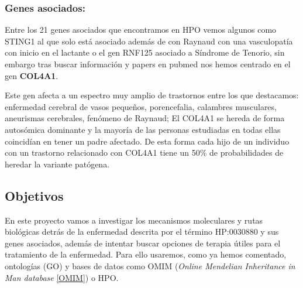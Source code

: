 \subsubsection{Genes asociados:}

Entre los 21 genes asociados que encontramos en HPO vemos algunos como STING1 al que solo está asociado además de con Raynaud con una vasculopatía con inicio en el lactante o el gen RNF125 asociado a Síndrome de Tenorio, sin embargo tras buscar información y papers en pubmed nos hemos centrado en el gen \textbf{COL4A1}. \cite{Plaisier1993}

Este gen afecta a un espectro muy amplio de trastornos entre los que destacamos: enfermedad cerebral de vasos pequeños, porencefalia, calambres musculares, aneurismas cerebrales, fenómeno de Raynaud; El COL4A1 se hereda de forma autosómica dominante y la mayoría de las personas estudiadas en todas ellas coincidían en tener un padre afectado. De esta forma cada hijo de un individuo con un trastorno relacionado con COL4A1 tiene un 50\% de probabilidades de heredar la variante patógena.

\subsection{Objetivos}

En este proyecto vamos a investigar los mecanismos moleculares y rutas biológicas detrás de la enfermedad descrita por el término HP:0030880 y sus genes asociados, además de intentar buscar opciones de terapia útiles para el tratamiento de la enfermedad. Para ello usaremos, como ya hemos comentado, ontologías (GO) y bases de datos como OMIM (\textit{Online Mendelian Inheritance in Man database} \ref{OMIM}) o HPO.


